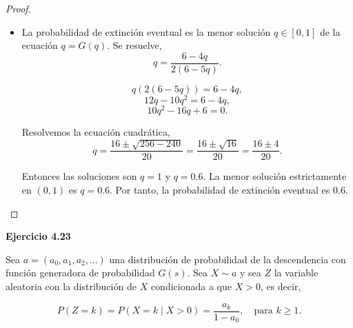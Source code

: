 \documentclass{article}
\begin{document}
\begin{proof}
\begin{itemize}
\[
G_0(s) = s, \quad G_{n+1}(s) = G(G_n(s)).
\]

realizando los cálculos, tenemos que,

\[
G_1(0) = G(0) = \frac{6}{12} = \frac{1}{2}.
\]

\[
G_2(0) = G\left(\frac{1}{2}\right) = \frac{6 - 4 \cdot \frac{1}{2}}{2(6 - 5 \cdot \frac{1}{2})} = \frac{6 - 2}{2(6 - 2.5)} = \frac{4}{2 \cdot 3.5} = \frac{4}{7}.
\]

\[
G_3(0) = G\left(\frac{4}{7}\right) = \frac{6 - 4 \cdot \frac{4}{7}}{2(6 - 5 \cdot \frac{4}{7})} = \frac{6 - \frac{16}{7}}{2\left(6 - \frac{20}{7}\right)} = \frac{\frac{42 - 16}{7}}{2 \cdot \frac{42 - 20}{7}} = \frac{\frac{26}{7}}{\frac{44}{7}} = \frac{26}{44} = \frac{13}{22}.
\]

\[
G_4(0) = G\left(\frac{13}{22}\right) = \frac{6 - 4 \cdot \frac{13}{22}}{2(6 - 5 \cdot \frac{13}{22})} = \frac{6 - \frac{52}{22}}{2(6 - \frac{65}{22})} = \frac{\frac{132 - 52}{22}}{2 \cdot \frac{132 - 65}{22}} = \frac{\frac{80}{22}}{\frac{134}{22}} = \frac{80}{134} = \frac{40}{67}.
\]

Por lo tanto,

\[
\mathbb{P}(Z_4 = 0) = \frac{40}{67} \approx 0.597.
\]
\item[(c)] La probabilidad de extinción eventual es la menor solución \( q \in [0, 1] \) de la ecuación \( q = G(q) \). Se resuelve,
\[
q = \frac{6 - 4q}{2(6 - 5q)}.
\]


\[
q (2(6 - 5q)) = 6 - 4q,
\]
\[
12q - 10q^2 = 6 - 4q,
\]
\[
10q^2 - 16q + 6 = 0.
\]

Resolvemos la ecuación cuadrática,
\[
q = \frac{16 \pm \sqrt{256 - 240}}{20} = \frac{16 \pm \sqrt{16}}{20} = \frac{16 \pm 4}{20}.
\]

Entonces las soluciones son \( q = 1 \) y \( q = 0.6 \). La menor solución estrictamente en \( (0, 1) \) es \( q = 0.6 \). Por tanto, la probabilidad de extinción eventual es \( 0.6 \).

\end{itemize}
\end{proof}
\textbf{Ejercicio 4.23}

Sea \( a = (a_0, a_1, a_2, \ldots) \) una distribución de probabilidad de la descendencia con función generadora de probabilidad \( G(s) \). Sea \( X \sim a \) y sea \( Z \) la variable aleatoria con la distribución de \( X \) condicionada a que \( X > 0 \), es decir,

\[
P(Z = k) = P(X = k \mid X > 0) = \frac{a_k}{1 - a_0}, \quad \text{para } k \geq 1.
\]
\end{document}
